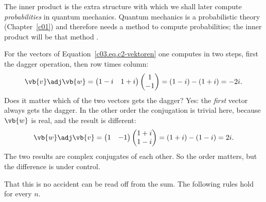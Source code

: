 The inner product is the extra structure with which we shall later compute
\emph{probabilities} in quantum mechanics. Quantum mechanics is a probabilistic theory
(Chapter~\ref{c01}) and therefore needs a method to compute probabilities; the inner product
will be that method .

\begin{example}\label{c03.ex.skalarprodukt}
  For the vectors of Equation~\eqref{c03.eq.c2-vektoren} one computes in two steps, first the
  dagger operation, then row times column:
  \begin{equation}\label{c03.eq.vw}
    \vb{v}\adj\vb{w}
    = \begin{pmatrix} 1-i & 1+i \end{pmatrix} \begin{pmatrix} 1 \\ -1 \end{pmatrix}
    = (1-i) - (1+i) = -2i .
  \end{equation}
  Does it matter which of the two vectors gets the dagger? Yes: the \emph{first} vector
  always gets the dagger. In the other order the conjugation is trivial here, because
  $\vb{w}$ is real, and the result is different:
  \begin{equation}\label{c03.eq.wv}
    \vb{w}\adj\vb{v}
    = \begin{pmatrix} 1 & -1 \end{pmatrix} \begin{pmatrix} 1+i \\ 1-i \end{pmatrix}
    = (1+i) - (1-i) = 2i .
  \end{equation}
  The two results are complex conjugates of each other. So the order matters, but the
  difference is under control.
\end{example}

That this is no accident can be read off from the sum. The following rules hold for every
$n$.


